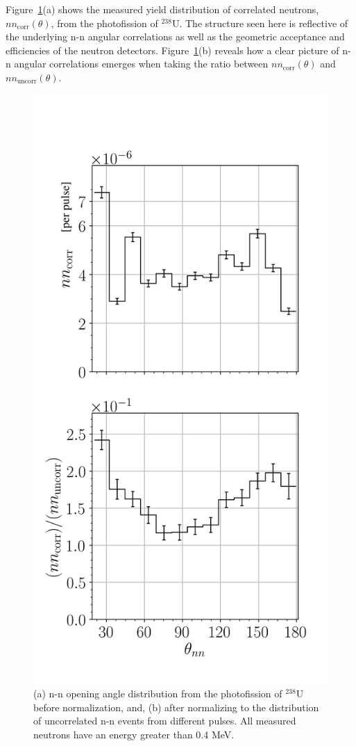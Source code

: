 Figure~\ref{fig:SPDPNormalization}(a) shows the measured yield distribution of correlated neutrons, $nn_{\text{corr}}(\theta)$, from the photofission of $^{238}$U.
The structure seen here is reflective of the underlying n-n angular correlations as well as the geometric acceptance and efficiencies of the neutron detectors.
Figure~\ref{fig:SPDPNormalization}(b) reveals how a clear picture of n-n angular correlations emerges when taking the ratio between $nn_{\text{corr}}(\theta)$ and $nn_{\text{uncorr}}(\theta)$.
\begin{figure}[]
\centering
    \includegraphics[width=\figsmall\textwidth]{SPDPNormalization.png}
    \caption{(a) n-n opening angle distribution from the photofission of $^{238}$U before normalization, and, (b) after normalizing to the distribution of uncorrelated n-n events from different pulses.
    All measured neutrons have an energy greater than 0.4 MeV.}
    \label{fig:SPDPNormalization}
\end{figure}


